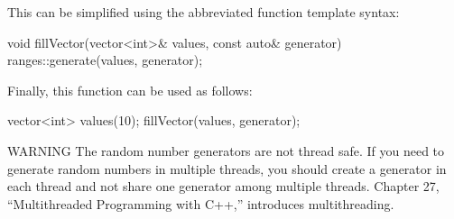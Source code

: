 This can be simplified using the abbreviated function template syntax:

\begin{cpp}
void fillVector(vector<int>& values, const auto& generator)
{
    ranges::generate(values, generator);
}
\end{cpp}

Finally, this function can be used as follows:

\begin{cpp}
vector<int> values(10);
fillVector(values, generator);
\end{cpp}

\begin{myWarning}{WARNING}
The random number generators are not thread safe. If you need to generate random numbers in multiple threads, you should create a generator in each thread and not share one generator among multiple threads. Chapter 27, “Multithreaded Programming with C++,” introduces multithreading.
\end{myWarning}








